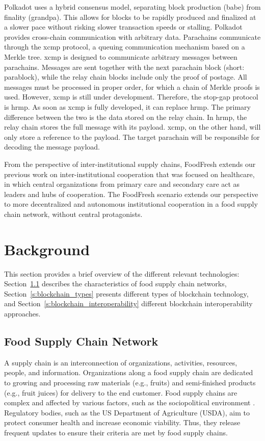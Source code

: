 \documentclass[conference,a4paper,flushend]{neutr}
\begin{document}
Polkadot uses a hybrid consensus model, separating block production (\ac{babe}) from finality (\ac{grandpa}). This allows for blocks to be rapidly produced and finalized at a slower pace without risking slower transaction speeds or stalling.  Polkadot provides cross-chain communication with arbitrary data. Parachains communicate through the \ac{xcmp} protocol, a queuing communication mechanism based on a Merkle tree. \ac{xcmp} is designed to communicate arbitrary messages between parachains. Messages are sent together with the next parachain block (short: parablock), while the relay chain blocks include only the proof of postage. All messages must be processed in proper order, for which a chain of Merkle proofs is used. However, \ac{xcmp} is still under development. Therefore, the stop-gap protocol is \ac{hrmp}. As soon as \ac{xcmp} is fully developed, it can replace \ac{hrmp}. The primary difference between the two is the data stored on the relay chain. In \ac{hrmp}, the relay chain stores the full message with its payload. \ac{xcmp}, on the other hand, will only store a reference to the payload. The target parachain will be responsible for decoding the message payload.

From the perspective of inter-institutional supply chains, FoodFresh extends our previous work on inter-institutional cooperation 
\cite{Neumann2013dissBook, NRDL09deus, NeLe12alphaFlow, NeLe09dmps} that was focused on healthcare, in which central organizations from primary care and secondary care act as leaders and hubs of cooperation.
The FoodFresh scenario extends our perspective to more decentralized and autonomous institutional cooperation in a food supply chain network, without central protagonists.

\section{Background} \label{s:background}
This section provides a brief overview of the different relevant technologies: Section~\ref{s:fscn} describes the characteristics of food supply chain networks, Section~\ref{s:blockchain_types} presents different types of blockchain technology, and Section~\ref{s:blockchain_interoperability} different blockchain interoperability approaches.

\subsection{Food Supply Chain Network} \label{s:fscn}
A supply chain is an interconnection of organizations, activities, resources, people, and information. Organizations along a food supply chain are dedicated to growing and processing raw materials (e.g., fruits) and semi-finished products (e.g., fruit juices) for delivery to the end customer. Food supply chains are complex and affected by various factors, such as the sociopolitical environment \cite{van2005innovations}. Regulatory bodies, such as the US Department of Agriculture (USDA), aim to protect consumer health and increase economic viability. Thus, they release frequent updates to ensure their criteria are met by food supply chains.
\end{document}
